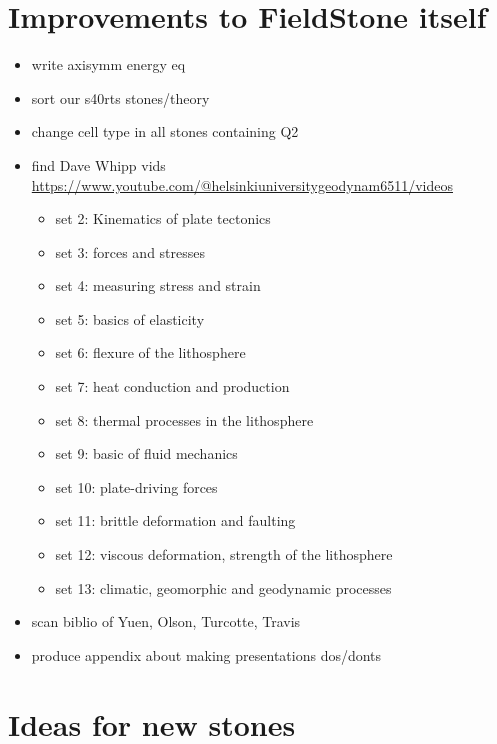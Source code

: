 \documentclass[a4paper]{article}
\begin{document}
\tableofcontents

\newpage
\section{Improvements to FieldStone itself}

\begin{itemize}
\item write axisymm energy eq 
\item sort our s40rts stones/theory
\item change cell type in all stones containing Q2
\item find Dave Whipp vids \url{https://www.youtube.com/@helsinkiuniversitygeodynam6511/videos}
\begin{itemize}
\item set 2: Kinematics of plate tectonics
\item set 3: forces and stresses
\item set 4: measuring stress and strain 
\item set 5: basics of elasticity
\item set 6: flexure of the lithosphere
\item set 7: heat conduction and production
\item set 8: thermal processes in the lithosphere
\item set 9: basic of fluid mechanics
\item set 10: plate-driving forces
\item set 11: brittle deformation and faulting
\item set 12: viscous deformation, strength of the lithosphere
\item set 13: climatic, geomorphic and geodynamic processes
\end{itemize}
\item scan biblio of Yuen, Olson, Turcotte, Travis
\item produce appendix about making presentations dos/donts 
\end{itemize}

\newpage
\section{Ideas for new stones}
\end{document}
